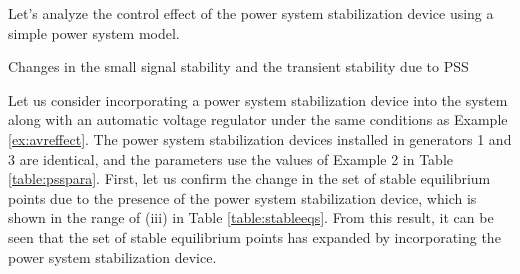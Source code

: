 \documentclass[graybox, envcountchap]{svmult}
\begin{document}
Let's analyze the control effect of the power system stabilization device using
a simple power system model.

\begin{example}{Changes in the small signal stability and the transient stability due to PSS}\label{ex:psseffect}

Let us consider incorporating a power system stabilization device into the
system along with an automatic voltage regulator under the same conditions as
Example \ref{ex:avreffect}. The power system stabilization devices installed in
generators 1 and 3 are identical, and the parameters use the values of Example 2
in Table \ref{table:psspara}. First, let us confirm the change in the set of
stable equilibrium points due to the presence of the power system stabilization
device, which is shown in the range of (iii) in Table \ref{table:stableeqs}. From
this result, it can be seen that the set of stable equilibrium points has
expanded by incorporating the power system stabilization device.

\end{example}
\end{document}
